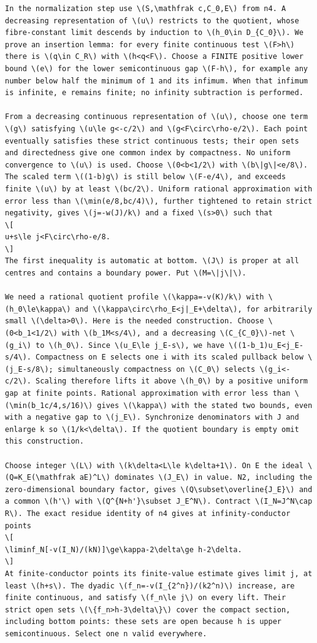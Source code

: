 \documentclass[11pt]{article}
\begin{document}
\begin{Verbatim}[fontsize=\tiny,breaklines=true,breakanywhere=true]
In the normalization step use \(S,\mathfrak c,C_0,E\) from n4. A decreasing representation of \(u\) restricts to the quotient, whose fibre-constant limit descends by induction to \(h_0\in D_{C_0}\). We prove an insertion lemma: for every finite continuous test \(F>h\) there is \(q\in C_R\) with \(h<q<F\). Choose a FINITE positive lower bound \(e\) for the lower semicontinuous gap \(F-h\), for example any number below half the minimum of 1 and its infimum. When that infimum is infinite, e remains finite; no infinity subtraction is performed.

From a decreasing continuous representation of \(u\), choose one term \(g\) satisfying \(u\le g<-c/2\) and \(g<F\circ\rho-e/2\). Each point eventually satisfies these strict continuous tests; their open sets and directedness give one common index by compactness. No uniform convergence to \(u\) is used. Choose \(0<b<1/2\) with \(b\|g\|<e/8\). The scaled term \((1-b)g\) is still below \(F-e/4\), and exceeds finite \(u\) by at least \(bc/2\). Uniform rational approximation with error less than \(\min(e/8,bc/4)\), further tightened to retain strict negativity, gives \(j=-w(J)/k\) and a fixed \(s>0\) such that
\[
u+s\le j<F\circ\rho-e/8.
\]
The first inequality is automatic at bottom. \(J\) is proper at all centres and contains a boundary power. Put \(M=\|j\|\).

We need a rational quotient profile \(\kappa=-v(K)/k\) with \(h_0\le\kappa\) and \(\kappa\circ\rho_E<j|_E+\delta\), for arbitrarily small \(\delta>0\). Here is the needed construction. Choose \(0<b_1<1/2\) with \(b_1M<s/4\), and a decreasing \(C_{C_0}\)-net \(g_i\) to \(h_0\). Since \(u_E\le j_E-s\), we have \((1-b_1)u_E<j_E-s/4\). Compactness on E selects one i with its scaled pullback below \(j_E-s/8\); simultaneously compactness on \(C_0\) selects \(g_i<-c/2\). Scaling therefore lifts it above \(h_0\) by a positive uniform gap at finite points. Rational approximation with error less than \(\min(b_1c/4,s/16)\) gives \(\kappa\) with the stated two bounds, even with a negative gap to \(j_E\). Synchronize denominators with J and enlarge k so \(1/k<\delta\). If the quotient boundary is empty omit this construction.

Choose integer \(L\) with \(k\delta<L\le k\delta+1\). On E the ideal \(Q=K_E(\mathfrak aE)^L\) dominates \(J_E\) in value. N2, including the zero-dimensional boundary factor, gives \(Q\subset\overline{J_E}\) and a common \(h'\) with \(Q^{N+h'}\subset J_E^N\). Contract \(I_N=J^N\cap R\). The exact residue identity of n4 gives at infinity-conductor points
\[
\liminf_N[-v(I_N)/(kN)]\ge\kappa-2\delta\ge h-2\delta.
\]
At finite-conductor points its finite-value estimate gives limit j, at least \(h+s\). The dyadic \(f_n=-v(I_{2^n})/(k2^n)\) increase, are finite continuous, and satisfy \(f_n\le j\) on every lift. Their strict open sets \(\{f_n>h-3\delta\}\) cover the compact section, including bottom points: these sets are open because h is upper semicontinuous. Select one n valid everywhere.


\end{Verbatim}
\end{document}
